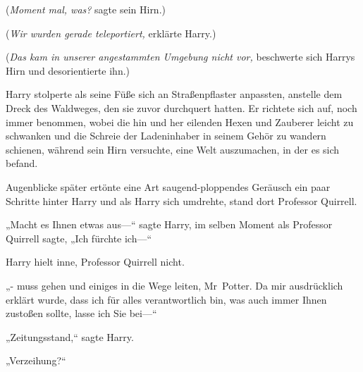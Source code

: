 (\emph{Moment mal, was?} sagte sein Hirn.)

(\emph{Wir wurden gerade teleportiert,} erklärte Harry.)

(\emph{Das kam in unserer angestammten Umgebung nicht vor,} beschwerte sich Harrys Hirn und desorientierte ihn.)

Harry stolperte als seine Füße sich an Straßenpflaster anpassten, anstelle dem Dreck des Waldweges, den sie zuvor durchquert hatten. Er richtete sich auf, noch immer benommen, wobei die hin und her eilenden Hexen und Zauberer leicht zu schwanken und die Schreie der Ladeninhaber in seinem Gehör zu wandern schienen, während sein Hirn versuchte, eine Welt auszumachen, in der es sich befand.

Augenblicke später ertönte eine Art saugend-ploppendes Geräusch ein paar Schritte hinter Harry und als Harry sich umdrehte, stand dort Professor Quirrell.

„Macht es Ihnen etwas aus—“ sagte Harry, im selben Moment als Professor Quirrell sagte, „Ich fürchte ich—“

Harry hielt inne, Professor Quirrell nicht.

„- muss gehen und einiges in die Wege leiten, Mr~Potter. Da mir ausdrücklich erklärt wurde, dass ich für alles verantwortlich bin, was auch immer Ihnen zustoßen sollte, lasse ich Sie bei—“

„Zeitungsstand,“ sagte Harry.

„Verzeihung?“

